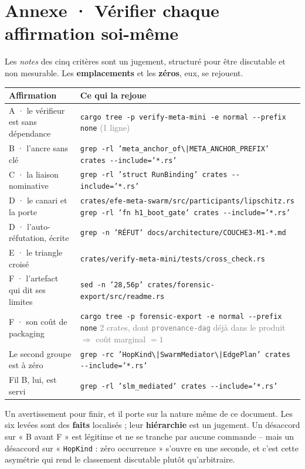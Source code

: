 \documentclass[10pt]{article}
\newcommand{\sz}[1]{\textcolor{grey}{\small\textsf{#1}}}
\newcommand{\code}[1]{\texttt{\small #1}}
\begin{document}
\section{Annexe · Vérifier chaque affirmation soi-même}

Les \emph{notes} des cinq critères sont un jugement, structuré pour être discutable et non mesurable.
Les \textbf{emplacements} et les \textbf{zéros}, eux, se rejouent.

\renewcommand{\arraystretch}{1.22}
\begin{center}\small
\begin{tabular}{@{}>{\raggedright\arraybackslash}p{5.3cm} >{\raggedright\arraybackslash}p{10.8cm}@{}}
\toprule
\textbf{Affirmation} & \textbf{Ce qui la rejoue} \\
\midrule
A · le vérifieur est sans dépendance &
  \code{cargo tree -p verify-meta-mini -e normal -{}-prefix none} \sz{(1 ligne)} \\
B · l'ancre sans clé &
  \code{grep -rl 'meta\_anchor\_of\textbackslash|META\_ANCHOR\_PREFIX' crates -{}-include='*.rs'} \\
C · la liaison nominative &
  \code{grep -rl 'struct RunBinding' crates -{}-include='*.rs'} \\
D · le canari et la porte &
  \code{crates/efe-meta-swarm/src/participants/lipschitz.rs} \newline
  \code{grep -rl 'fn h1\_boot\_gate' crates -{}-include='*.rs'} \\
D · l'auto-réfutation, écrite &
  \code{grep -n 'RÉFUT' docs/architecture/COUCHE3-M1-*.md} \\
E · le triangle croisé &
  \code{crates/verify-meta-mini/tests/cross\_check.rs} \\
F · l'artefact qui dit ses limites &
  \code{sed -n '28,56p' crates/forensic-export/src/readme.rs} \\
F · son coût de packaging &
  \code{cargo tree -p forensic-export -e normal -{}-prefix none} \newline \sz{2 crates, dont \code{provenance-dag} déjà dans le produit $\Rightarrow$ coût marginal $= 1$} \\
Le second groupe est à zéro &
  \code{grep -rc 'HopKind\textbackslash|SwarmMediator\textbackslash|EdgePlan' crates -{}-include='*.rs'} \\
Fil B, lui, est servi &
  \code{grep -rl 'slm\_mediated' crates -{}-include='*.rs'} \\
\bottomrule
\end{tabular}
\end{center}

Un avertissement pour finir, et il porte sur la nature même de ce document. Les six levées sont des
\textbf{faits} localisés ; leur \textbf{hiérarchie} est un jugement. Un désaccord sur « B avant F » est
légitime et ne se tranche par aucune commande -- mais un désaccord sur « \code{HopKind} : zéro
occurrence » s'ouvre en une seconde, et c'est cette asymétrie qui rend le classement discutable plutôt
qu'arbitraire.
\end{document}
